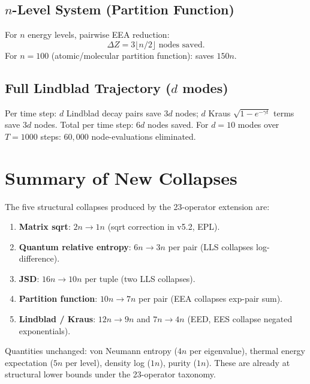 \documentclass[11pt]{article}
\begin{document}
\subsection{$n$-Level System (Partition Function)}

For $n$ energy levels, pairwise EEA reduction:
\[
\Delta Z = 3\lfloor n/2\rfloor \text{ nodes saved.}
\]
For $n=100$ (atomic/molecular partition function): saves $150n$.

\subsection{Full Lindblad Trajectory ($d$ modes)}

Per time step: $d$ Lindblad decay pairs save $3d$ nodes;
$d$ Kraus $\sqrt{1-e^{-\gamma t}}$ terms save $3d$ nodes.
Total per time step: $6d$ nodes saved.
For $d=10$ modes over $T=1000$ steps: $60{,}000$ node-evaluations eliminated.

\section{Summary of New Collapses}

The five structural collapses produced by the 23-operator extension are:

\begin{enumerate}
  \item \textbf{Matrix sqrt}: $2n\to1n$ (sqrt correction in v5.2, EPL).
  \item \textbf{Quantum relative entropy}: $6n\to3n$ per pair (LLS collapses log-difference).
  \item \textbf{JSD}: $16n\to10n$ per tuple (two LLS collapses).
  \item \textbf{Partition function}: $10n\to7n$ per pair (EEA collapses exp-pair sum).
  \item \textbf{Lindblad / Kraus}: $12n\to9n$ and $7n\to4n$ (EED, EES collapse negated exponentials).
\end{enumerate}

Quantities unchanged: von Neumann entropy ($4n$ per eigenvalue), thermal energy
expectation ($5n$ per level), density log ($1n$), purity ($1n$). These are already
at structural lower bounds under the 23-operator taxonomy.
\end{document}
